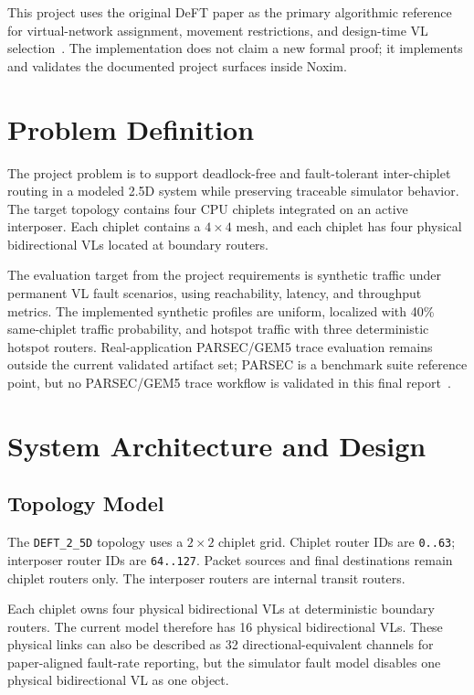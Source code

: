 \documentclass[conference]{IEEEtran}
\begin{document}
This project uses the original DeFT paper as the primary algorithmic reference for virtual-network assignment, movement restrictions, and design-time VL selection~\cite{Taheri2022DeFT}. The implementation does not claim a new formal proof; it implements and validates the documented project surfaces inside Noxim.

\section{Problem Definition}

The project problem is to support deadlock-free and fault-tolerant inter-chiplet routing in a modeled 2.5D system while preserving traceable simulator behavior. The target topology contains four CPU chiplets integrated on an active interposer. Each chiplet contains a $4 \times 4$ mesh, and each chiplet has four physical bidirectional VLs located at boundary routers.

The evaluation target from the project requirements is synthetic traffic under permanent VL fault scenarios, using reachability, latency, and throughput metrics. The implemented synthetic profiles are uniform, localized with 40\% same-chiplet traffic probability, and hotspot traffic with three deterministic hotspot routers. Real-application PARSEC/GEM5 trace evaluation remains outside the current validated artifact set; PARSEC is a benchmark suite reference point, but no PARSEC/GEM5 trace workflow is validated in this final report~\cite{Bienia2011PARSEC}.

\section{System Architecture and Design}

\subsection{Topology Model}

The \texttt{DEFT\_2\_5D} topology uses a $2 \times 2$ chiplet grid. Chiplet router IDs are \texttt{0..63}; interposer router IDs are \texttt{64..127}. Packet sources and final destinations remain chiplet routers only. The interposer routers are internal transit routers.

Each chiplet owns four physical bidirectional VLs at deterministic boundary routers. The current model therefore has 16 physical bidirectional VLs. These physical links can also be described as 32 directional-equivalent channels for paper-aligned fault-rate reporting, but the simulator fault model disables one physical bidirectional VL as one object.
\end{document}
